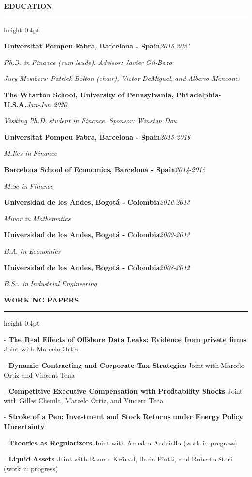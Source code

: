 \documentclass[11pt,letterpaper]{article}
\makeatletter
\newcommand{\cvsection}[1]{%
  \par\vspace{12.80pt}%
  \textbf{#1}\par\nobreak
  \vspace{6.08pt}\hrule height 0.4pt\nobreak\vspace{6.9pt}\nobreak}
\newenvironment{cvbody}
  {\begin{list}{}{%
      \@beginparpenalty\@M      %
      \setlength{\leftmargin}{1.5em}%
      \setlength{\rightmargin}{0pt}%
      \setlength{\labelwidth}{0pt}%
      \setlength{\labelsep}{0pt}%
      \setlength{\listparindent}{0pt}%
      \setlength{\itemindent}{0pt}%
      \setlength{\topsep}{0pt}%
      \setlength{\partopsep}{0pt}%
      \setlength{\parsep}{0pt}%
      \setlength{\itemsep}{0pt}}%
   \item\relax}
  {\end{list}}
\newcommand{\dated}[2]{#1\hfill\textit{#2}\par}
\makeatother
\begin{document}
\cvsection{EDUCATION}
\begin{cvbody}
\dated{\textbf{Universitat Pompeu Fabra, Barcelona - Spain}}{2016-2021}
\textit{Ph.D. in Finance (cum laude). Advisor: Javier Gil-Bazo}\par
\textit{Jury Members: Patrick Bolton (chair), Victor DeMiguel, and Alberto Manconi.}\par
\dated{\textbf{The Wharton School, University of Pennsylvania, Philadelphia-U.S.A.}}{Jan-Jun 2020}
\textit{Visiting Ph.D. student in Finance. Sponsor: Winston Dou}\par
\dated{\textbf{Universitat Pompeu Fabra, Barcelona - Spain}}{2015-2016}
\textit{M.Res in Finance}\par
\dated{\textbf{Barcelona School of Economics, Barcelona - Spain}}{2014-2015}
\textit{M.Sc in Finance}\par
\dated{\textbf{Universidad de los Andes, Bogotá - Colombia}}{2010-2013}
\textit{Minor in Mathematics}\par
\dated{\textbf{Universidad de los Andes, Bogotá - Colombia}}{2009-2013}
\textit{B.A. in Economics}\par
\dated{\textbf{Universidad de los Andes, Bogotá - Colombia}}{2008-2012}
\textit{B.Sc. in Industrial Engineering}\par
\end{cvbody}

\cvsection{WORKING PAPERS}
\begin{cvbody}
- \textbf{The Real Effects of Offshore Data Leaks: Evidence from private firms} Joint with Marcelo Ortiz.\par
- \textbf{Dynamic Contracting and Corporate Tax Strategies } Joint with Marcelo Ortiz and Vincent Tena\par
- \textbf{Competitive Executive Compensation with Profitability Shocks} Joint with Gilles Chemla, Marcelo Ortiz, and Vincent Tena\par
- \textbf{Stroke of a Pen: Investment and Stock Returns under Energy Policy Uncertainty}\par
- \textbf{Theories as Regularizers} Joint with Amedeo Andriollo (work in progress)\par
- \textbf{Liquid Assets} Joint with Roman Kräussl, Ilaria Piatti, and Roberto Steri (work in progress)\par
\end{cvbody}
\end{document}
